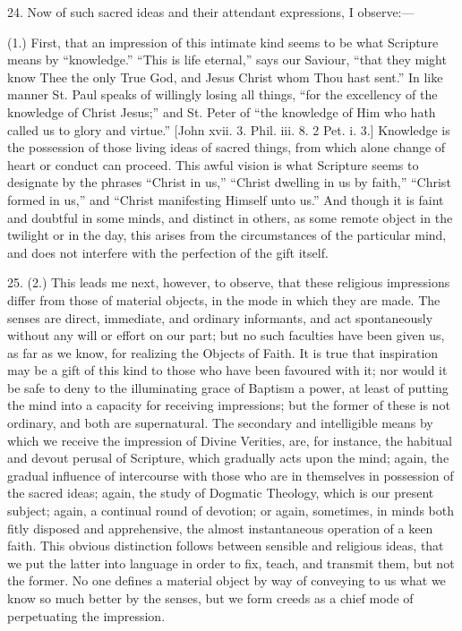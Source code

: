 24. Now of such sacred ideas and their attendant expressions, I
observe:—

(1.) First, that an impression of this intimate kind seems to be
what Scripture means by ``knowledge.'' ``This is life
eternal,'' says our Saviour, ``that they might know Thee the
only True God, and Jesus Christ whom Thou hast sent.'' In like
manner St. Paul speaks of willingly losing all things, ``for the
excellency of the knowledge of Christ Jesus;'' and St. Peter of
``the knowledge of Him who hath called us to glory and
virtue.'' [John xvii. 3. Phil. iii. 8. 2 Pet. i. 3.] Knowledge is
the possession of those living ideas of sacred things, from which
alone change of heart or conduct can proceed. This awful vision is
what Scripture seems to designate by the phrases ``Christ in
us,'' ``Christ dwelling in us by faith,'' ``Christ
formed in us,'' and ``Christ manifesting Himself unto
us.'' And though it is faint and doubtful in some minds, and
distinct in others, as some remote object in the twilight or in the
day, this arises from the circumstances of the particular mind, and
does not interfere with the perfection of the gift itself.

25. (2.) This leads me next, however, to observe, that these
religious impressions differ from those of material objects, in the
mode in which they are made. The senses are direct, immediate, and
ordinary informants, and act spontaneously without any will or effort
on our part; but no such faculties have been given us, as far as we
know, for realizing the Objects of Faith. It is true that inspiration
may be a gift of this kind to those who have been favoured with it;
nor would it be safe to deny to the illuminating grace of Baptism a
power, at least of putting the mind into a capacity for receiving
impressions; but the former of these is not ordinary, and both are
supernatural. The secondary and intelligible means by which we receive
the impression of Divine Verities, are, for instance, the habitual and
devout perusal of Scripture, which gradually acts upon the mind;
again, the gradual influence of intercourse with those who are in
themselves in possession of the sacred ideas; again, the study of
Dogmatic Theology, which is our present subject; again, a continual
round of devotion; or again, sometimes, in minds both fitly disposed
and apprehensive, the almost instantaneous operation of a keen faith.
This obvious distinction follows between sensible and religious ideas,
that we put the latter into language in order to fix, teach, and
transmit them, but not the former. No one defines a material object by
way of conveying to us what we know so much better by the senses, but
we form creeds as a chief mode of perpetuating the impression.


